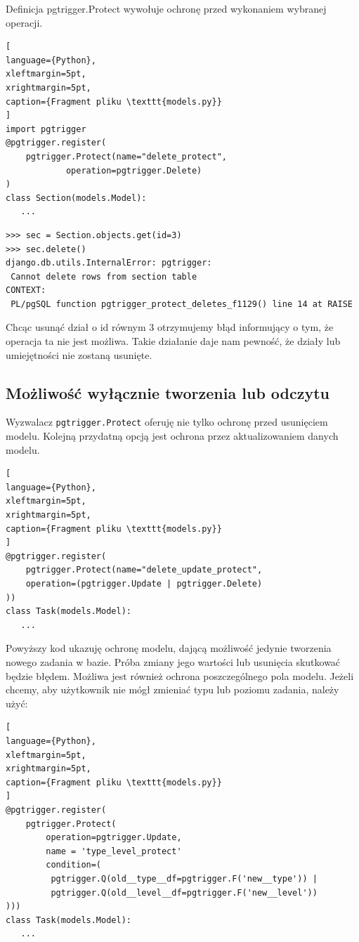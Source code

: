 \documentclass[oneside,polski,logo,indent]{amuthesis}
\begin{document}
Definicja pgtrigger.Protect wywołuje ochronę przed wykonaniem wybranej operacji.
\begin{lstlisting}[
language={Python},
xleftmargin=5pt,
xrightmargin=5pt,
caption={Fragment pliku \texttt{models.py}}
]
import pgtrigger
@pgtrigger.register(
	pgtrigger.Protect(name="delete_protect",
			operation=pgtrigger.Delete)
)
class Section(models.Model):
   ...
\end{lstlisting}
\begin{lstlisting}[style=DOS]
>>> sec = Section.objects.get(id=3)
>>> sec.delete()
django.db.utils.InternalError: pgtrigger: 
 Cannot delete rows from section table
CONTEXT:  
 PL/pgSQL function pgtrigger_protect_deletes_f1129() line 14 at RAISE
\end{lstlisting}
Chcąc usunąć dział o id równym 3 otrzymujemy błąd informujący o tym, że operacja ta nie jest możliwa. Takie działanie daje nam pewność, że działy lub umiejętności nie zostaną usunięte.
\begin{center}
\subsection{Możliwość wyłącznie tworzenia lub odczytu}
\end{center}

Wyzwalacz \texttt{pgtrigger.Protect} oferuję nie tylko ochronę przed usunięciem modelu. Kolejną przydatną opcją jest ochrona przez aktualizowaniem danych modelu.
\begin{lstlisting}[
language={Python},
xleftmargin=5pt,
xrightmargin=5pt,
caption={Fragment pliku \texttt{models.py}}
]
@pgtrigger.register(
    pgtrigger.Protect(name="delete_update_protect",
	operation=(pgtrigger.Update | pgtrigger.Delete)
))
class Task(models.Model):
   ...
\end{lstlisting}
Powyższy kod ukazuję ochronę modelu, dającą możliwość jedynie tworzenia nowego zadania w bazie. Próba zmiany jego wartości lub usunięcia skutkować będzie błędem. Możliwa jest również ochrona poszczególnego pola modelu.
Jeżeli chcemy, aby użytkownik nie mógł zmieniać typu lub poziomu zadania, należy użyć:

\begin{lstlisting}[
language={Python},
xleftmargin=5pt,
xrightmargin=5pt,
caption={Fragment pliku \texttt{models.py}}
]
@pgtrigger.register(
    pgtrigger.Protect(
        operation=pgtrigger.Update,
        name = 'type_level_protect'
        condition=(
         pgtrigger.Q(old__type__df=pgtrigger.F('new__type')) |
         pgtrigger.Q(old__level__df=pgtrigger.F('new__level'))
)))
class Task(models.Model):
   ...
\end{lstlisting}
\end{document}
